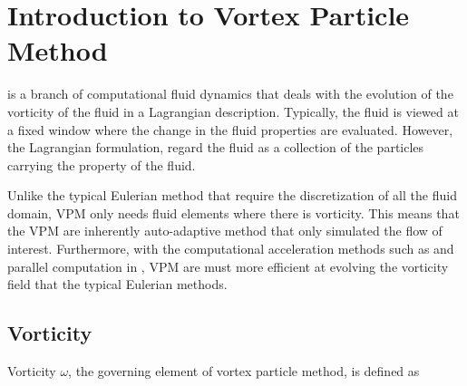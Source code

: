 


\section{Introduction to Vortex Particle Method}
 is a branch of computational fluid dynamics that deals with the evolution of the vorticity of the fluid in a Lagrangian description. Typically, the fluid is viewed at a fixed window where the change in the fluid properties are evaluated. However, the Lagrangian formulation, regard the fluid as a collection of the particles carrying the property of the fluid. 


Unlike the typical Eulerian method that require the discretization of all the fluid domain, VPM only needs fluid elements where there is vorticity. This means that the VPM are inherently auto-adaptive method that only simulated the flow of interest. Furthermore, with the computational acceleration methods such as  and parallel computation in , VPM are must more efficient at evolving the vorticity field that the typical Eulerian methods.

\subsection{Vorticity}
Vorticity $\omega$, the governing element of vortex particle method, is defined as

